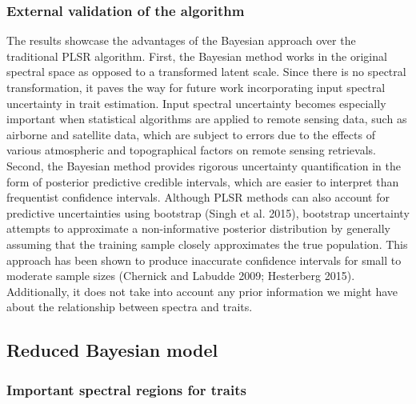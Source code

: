\documentclass[
  letterpaper,
  DIV=11,
  numbers=noendperiod]{scrartcl}
\begin{document}
\hypertarget{external-validation-of-the-algorithm}{%
\subsubsection{External validation of the
algorithm}\label{external-validation-of-the-algorithm}}

The results showcase the advantages of the Bayesian approach over the
traditional PLSR algorithm. First, the Bayesian method works in the
original spectral space as opposed to a transformed latent scale. Since
there is no spectral transformation, it paves the way for future work
incorporating input spectral uncertainty in trait estimation. Input
spectral uncertainty becomes especially important when statistical
algorithms are applied to remote sensing data, such as airborne and
satellite data, which are subject to errors due to the effects of
various atmospheric and topographical factors on remote sensing
retrievals. Second, the Bayesian method provides rigorous uncertainty
quantification in the form of posterior predictive credible intervals,
which are easier to interpret than frequentist confidence intervals.
Although PLSR methods can also account for predictive uncertainties
using bootstrap (Singh et al. 2015), bootstrap uncertainty attempts to
approximate a non-informative posterior distribution by generally
assuming that the training sample closely approximates the true
population. This approach has been shown to produce inaccurate
confidence intervals for small to moderate sample sizes (Chernick and
Labudde 2009; Hesterberg 2015). Additionally, it does not take into
account any prior information we might have about the relationship
between spectra and traits.

\hypertarget{reduced-bayesian-model-1}{%
\subsection{Reduced Bayesian model}\label{reduced-bayesian-model-1}}

\hypertarget{important-spectral-regions-for-traits-1}{%
\subsubsection{Important spectral regions for
traits}\label{important-spectral-regions-for-traits-1}}
\end{document}
